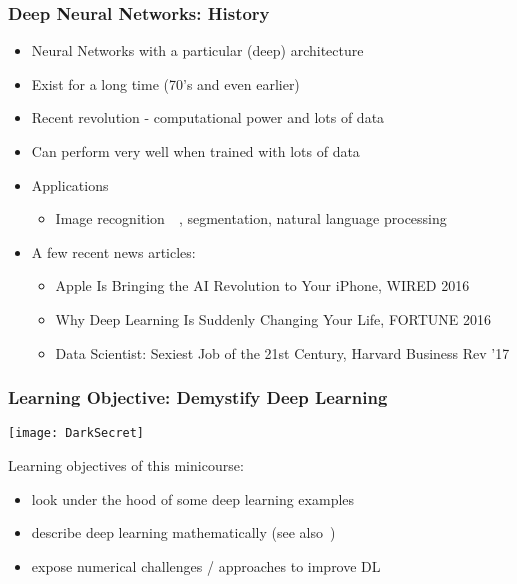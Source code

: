 \documentclass[12pt,fleqn]{beamer}
\begin{document}
\begin{frame}\frametitle{Deep Neural Networks: History}

\begin{itemize}
	\item Neural Networks with a particular (deep) architecture
    \item Exist for a long time (70's and even earlier)~\cite{Rosenblatt1958,Rumelhart1986,LeCun1990}
    \item Recent revolution - computational power and lots of data~\cite{bengio2009learning,RainaEtAl2009,lecun2015deep}
    \item Can perform very well when trained with lots of data
    \item Applications
    \begin{itemize}
    \item Image recognition~~\cite{hinton2012deep,KrizhevskySutskeverHinton2012,lecun2015deep}, segmentation, natural language processing~\cite{BordesEtAl2014,CollobertEtAl2011,  JeanEtAl2014}
    \end{itemize}


    \pause

\item A few recent news articles:

 \begin{itemize}
    \item
{Apple Is Bringing the AI Revolution to Your iPhone, WIRED 2016}
\item
{Why Deep Learning Is Suddenly Changing Your Life,  FORTUNE 2016}
\item Data Scientist: Sexiest Job of the 21st Century, Harvard Business Rev ’17
\end{itemize}

\end{itemize}
\end{frame}


\begin{frame}
	\frametitle{Learning Objective: Demystify Deep Learning}
	\begin{center}
		\texttt{[image: DarkSecret]}
	\end{center}
	
	Learning objectives of this minicourse:
	\begin{itemize}
		\item look under the hood of some deep learning examples
		\item describe deep learning mathematically (see also~\cite{HighamHigham2018})
		\item expose numerical challenges / approaches to improve DL
	\end{itemize}
\end{frame}
\end{document}
